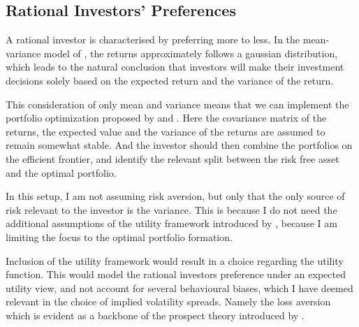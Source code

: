 

\subsection{Rational Investors' Preferences}

A rational investor is characterised by preferring more to less. In the mean-variance model of \cite{markowitz1952portfolio}, the returns approximately follows a gaussian distribution, which leads to the natural conclusion that investors will make their investment decisions solely based on the expected return and the variance of the return. 

This consideration of only mean and variance means that we can implement the portfolio optimization proposed by \cite{markowitz1952portfolio} and \cite{markowitz1959efficient}. Here the covariance matrix of the returns, the expected value and the variance of the returns are assumed to remain somewhat stable. And the investor should then combine the portfolios on the efficient frontier, and identify the relevant split between the risk free asset and the optimal portfolio.

In this setup, I am not assuming risk aversion, but only that the only source of risk relevant to the investor is the variance. This is because I do not need the additional assumptions of the utility framework introduced by \cite{von2007theory}, because I am limiting the focus to the optimal portfolio formation. 

Inclusion of the utility framework would result in a choice regarding the utility function. This would model the rational investors preference under an expected utility view, and not account for several behavioural biases, which I have deemed relevant in the choice of implied volatility spreads. Namely the loss aversion which is evident as a backbone of the prospect theory introduced by \cite{kahneman2013prospect}.

